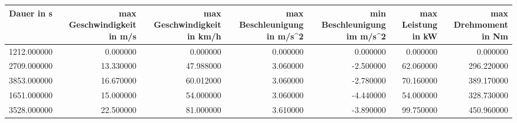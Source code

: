 \begin{tabular}{rrrrrrr}
\toprule
Dauer in s & max Geschwindigkeit in m/s & max Geschwindigkeit in km/h & max Beschleunigung in m/s^2 & min Beschleunigung im m/s^2 & max Leistung in kW & max Drehmoment in Nm \\
\midrule
1212.000000 & 0.000000 & 0.000000 & 0.000000 & 0.000000 & 0.000000 & 0.000000 \\
2709.000000 & 13.330000 & 47.988000 & 3.060000 & -2.500000 & 62.060000 & 296.220000 \\
3853.000000 & 16.670000 & 60.012000 & 3.060000 & -2.780000 & 70.160000 & 389.170000 \\
1651.000000 & 15.000000 & 54.000000 & 3.060000 & -4.440000 & 54.000000 & 328.730000 \\
3528.000000 & 22.500000 & 81.000000 & 3.610000 & -3.890000 & 99.750000 & 450.960000 \\
\bottomrule
\end{tabular}
